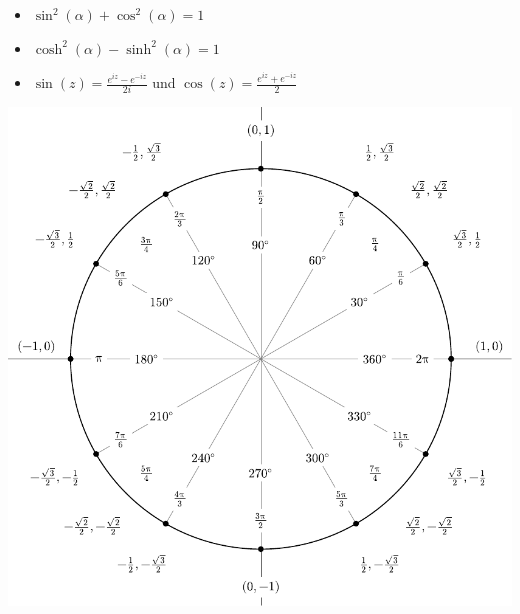 \documentclass[a4paper,fontsize = 10pt]{article}
\begin{document}
\begin{itemize}
 \item $\sin^2(\alpha) + \cos^2(\alpha) = 1$
 \item $\cosh^2(\alpha) - \sinh^2(\alpha) = 1$
 \item $\sin(z) = \frac{e^{iz} - e^{-iz}}{2i}$ und $\cos(z) = \frac{e^{iz} + e^{-iz}}{2}$
\end{itemize}

\begingroup
\renewcommand*{\arraystretch}{2}


\begin{center}
  \includegraphics[width=\linewidth]{include_degrees_circle.pdf}
  
\end{center}
\end{document}
